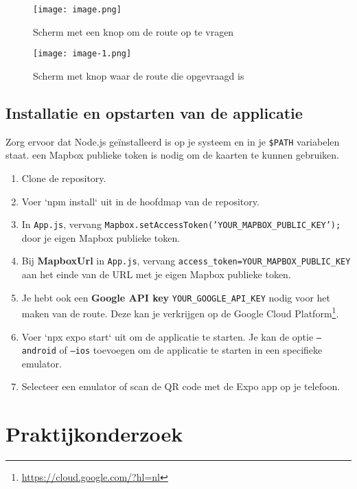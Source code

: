 \begin{figure}[htbp]
    \centering
    \texttt{[image: image.png]}
    \caption{Scherm met een knop om de route op te vragen}
    \label{fig:Scherm met een knop om de route op te vragen}
\end{figure}

\begin{figure}[htbp]
    \centering
    \texttt{[image: image-1.png]}
    \caption{Scherm met knop waar de route die opgevraagd is}
    \label{fig:Scherm met knop waar route die opgevraagd is}
\end{figure}

\subsection{Installatie en opstarten van de applicatie}
\label{sec:installatie en opstarten van de applicatie}

Zorg ervoor dat Node.js geïnstalleerd is op je systeem en in je \texttt{\$PATH} variabelen staat.
een Mapbox publieke token is nodig om de kaarten te kunnen gebruiken.

\begin{enumerate}
    \item Clone de repository.
    \item Voer `npm install` uit in de hoofdmap van de repository.
    \item In \texttt{App.js}, vervang \texttt{Mapbox.setAccessToken('YOUR\_MAPBOX\_PUBLIC\_KEY');} door je eigen Mapbox publieke token.
    \item Bij \textbf{MapboxUrl} in \texttt{App.js}, vervang \texttt{access\_token=YOUR\_MAPBOX\_PUBLIC\_KEY} aan het einde van de URL met je eigen Mapbox publieke token.
    \item Je hebt ook een \textbf{Google API key} \texttt{YOUR\_GOOGLE\_API\_KEY} nodig voor het maken van de route. Deze kan je verkrijgen op de Google Cloud Platform\footnote{\url{https://cloud.google.com/?hl=nl}}.
    \item Voer `npx expo start` uit om de applicatie te starten. Je kan de optie \texttt{--android} of \texttt{--ios} toevoegen om de applicatie te starten in een specifieke emulator.
    \item Selecteer een emulator of scan de QR code met de Expo app op je telefoon.
\end{enumerate}

\section{Praktijkonderzoek}
\label{sec:praktijkonderzoek}

